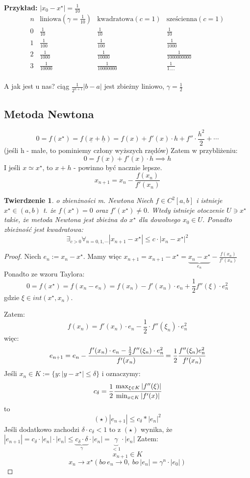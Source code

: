 \documentclass[hidelinks,a4paper,fleqn,oneside]{book}
\newcommand{\ra}{\rightarrow}
\newtheorem{twierdz}{Twierdzenie}
\begin{document}
\textbf{Przykład:} $|x_0 - x^\star| = \frac{1}{10}$
\[
\begin{array}{c|c|c|c}
n & \textrm{liniowa} (\gamma = \frac{1}{10}) & \textrm{kwadratowa} (c = 1) & \textrm{sześcienna} (c=1) \\ \hline
0 & \frac{1}{10} & \frac{1}{10} & \frac{1}{10} \\
1 & \frac{1}{100} & \frac{1}{100} & \frac{1}{1000} \\
2 & \frac{1}{1000} & \frac{1}{10000} & \frac{1}{1000000000} \\
3 & \frac{1}{10000} & \frac{1}{10000000} & \frac{1}{1....} \\
\end{array}
\]

A jak jest u nas? ciąg $\frac{1}{2^{n+1}}|b-a|$ jest zbieżny liniowo, $\gamma = \frac{1}{2}$

\subsection{Metoda Newtona}

\[
	0 = f(x^\star) = f(\underline{x} + \underline{h}) = f(x) + f'(x)\cdot h + f''\cdot\frac{h^2}{2} + \cdots
\]
(jeśli h - małe, to pominiemy człony wyższych rzędów)
Zatem w przybliżeniu:
\[
	0 = f(x) + f'(x) \cdot h \implies h
\]
I jeśli $x \simeq x^\star$, to $x+h$ - powinno być nacznie lepsze.
\[
	x_{n+1} = x_n - \frac{f(x_n)}{f'(x_n)}
\]

\begin{twierdz}{o zbienżności m. Newtona}
	Niech $f \in C^2[a, b]$ i istnieje $x^\star \in (a, b)$ t. że $f(x^\star) = 0$ oraz $f'(x^\star) \neq 0$. Wtedy istnieje otoczenie $U \ni x^\star$ takie, że metoda Newtona jest zbieżna do $x^\star$ dla dowolnego $x_0 \in U$. Ponadto zbieżność jest kwadratowa:
	\[
		\exists_{c>0} \forall_{n = 0, 1, \cdots} |x_{n+1} - x^\star| \leq c \cdot |x_n - x^\star|^2
	\]
\end{twierdz}

\begin{proof}
	Niech $e_n := x_n - x^\star$. Mamy więc $x_{n+1} = x_{n+1} - x^\star = \underbrace{x_n - x^\star}_{e_n} - \frac{f(x_n)}{f'(x_n)}$
	Ponadto ze wzoru Taylora:
	\[
	0 = f(x^\star) = f(x_n - e_n) = f(x_n) - f'(x_n)\cdot e_n + \frac{1}{2}f''(\xi)\cdot e_n^2
	\]
	gdzie
	$\xi \in int(x^\star, x_n)$.
	
	Zatem:
	\[
		f(x_n) = f'(x_n) \cdot e_n - \frac{1}{2} \cdot f''(\xi_n) \cdot e_n^2
	\]
	więc:
	\[
		e_{n+1} = e_n - \cfrac{f'(x_n)\cdot e_n - \frac{1}{2}f''(\xi_n)\cdot e_n^2}{f'(x_n)} = \frac{1}{2}\cfrac{f''(\xi_n)e_n^2}{f'(x_n)}
	\]
	Jeśli $x_n \in K := \{y : |y - x^\star| \leq \delta\}$
	i oznaczymy:
	\[
		c_\delta = \frac{1}{2} \cfrac{\max_{\xi \in K} |f''(\xi)|}{\min_{x \in K}|f'(x)|}
	\]
	to
	\[
		(\star) |e_{n+1}| \leq c_\delta * |e_n|^2
	\]
	Jeśli dodatkowo zachodzi $\delta \cdot c_\delta < 1$ to z $(\star)$ wynika, że $|e_{n+1}| = c_\delta \cdot |e_n| \cdot |e_n| \leq \underbrace{c_\delta \cdot \delta}_{\gamma} \cdot |e_n| = \underbrace{\gamma}_{<1} \cdot |e_n|$
	Zatem:
	\[
		x_{n+1} \in K
	\]
	\[
		x_n \ra x^\star (bo\ e_n \ra 0,\ bo\ |e_n| = \gamma^n\cdot|e_0|)
	\]
\end{proof}
\end{document}
